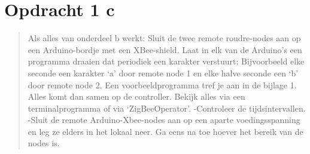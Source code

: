 \documentclass[12pt]{article}
\begin{document}
\section*{Opdracht 1 c}
\begin{quote}
Als alles van onderdeel b werkt: Sluit de twee remote roudre-nodes aan op een Arduino-bordje met een XBee-shield. Laat in elk van de Arduino’s een programma draaien dat periodiek een karakter verstuurt: Bijvoorbeeld elke seconde een karakter ‘a’ door remote node 1 en elke halve seconde een ‘b’ door remote node 2. Een voorbeeldprogramma tref je aan in de bijlage 1. Alles komt dan samen op de controller. Bekijk alles via een terminalprogramma of via ‘ZigBeeOperator’. -Controleer de tijdsintervallen. -Sluit de remote Arduino-Xbee-nodes aan op een aparte voedingsspanning en leg ze elders in het lokaal neer. Ga eens na toe hoever het bereik van de nodes is.
\end{quote}
\newpage
\end{document}
